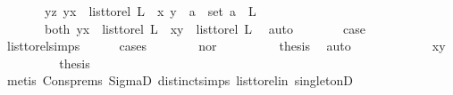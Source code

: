 \begin{isabellebody}
\ \ \ \ \ \ {\isacharbar}{\kern0pt}\ {\isacharparenleft}{\kern0pt}yz{\isacharparenright}{\kern0pt}\ {\isachardoublequoteopen}{\isacharparenleft}{\kern0pt}y{\isacharcomma}{\kern0pt}x{\isacharparenright}{\kern0pt}\ {\isasymin}\ list{\isacharunderscore}{\kern0pt}to{\isacharunderscore}{\kern0pt}rel\ L\ {\isasymand}\ {\isacharparenleft}{\kern0pt}x{\isacharcomma}{\kern0pt}\ y{\isacharparenright}{\kern0pt}\ {\isasymin}\ {\isacharbraceleft}{\kern0pt}a{\isacharbraceright}{\kern0pt}\ {\isasymtimes}\ set\ {\isacharparenleft}{\kern0pt}a\ {\isacharhash}{\kern0pt}\ L{\isacharparenright}{\kern0pt}{\isachardoublequoteclose}\isanewline
\ \ \ \ \ \ {\isacharbar}{\kern0pt}\ {\isacharparenleft}{\kern0pt}both{\isacharparenright}{\kern0pt}\ {\isachardoublequoteopen}{\isacharparenleft}{\kern0pt}y{\isacharcomma}{\kern0pt}x{\isacharparenright}{\kern0pt}\ {\isasymin}\ list{\isacharunderscore}{\kern0pt}to{\isacharunderscore}{\kern0pt}rel\ L\ {\isasymand}\ {\isacharparenleft}{\kern0pt}x{\isacharcomma}{\kern0pt}y{\isacharparenright}{\kern0pt}\ {\isasymin}\ list{\isacharunderscore}{\kern0pt}to{\isacharunderscore}{\kern0pt}rel\ L{\isachardoublequoteclose}\ \isamarkupfalse%
\ auto\isanewline
\ \ \ \ \isamarkupfalse%
\ \isamarkupfalse%
\ {\isacharquery}{\kern0pt}case\ \isamarkupfalse%
\ list{\isacharunderscore}{\kern0pt}to{\isacharunderscore}{\kern0pt}rel{\isachardot}{\kern0pt}simps\ \isanewline
\ \ \ \ \isamarkupfalse%
{\isacharparenleft}{\kern0pt}cases{\isacharparenright}{\kern0pt}\isanewline
\ \ \ \ \ \ \isamarkupfalse%
\ nor\isanewline
\ \ \ \ \ \ \isamarkupfalse%
\ \isamarkupfalse%
\ {\isacharquery}{\kern0pt}thesis\ \isamarkupfalse%
\ auto\isanewline
\ \ \ \ \isamarkupfalse%
\isanewline
\ \ \ \ \ \ \isamarkupfalse%
\ xy\isanewline
\ \ \ \ \ \ \isamarkupfalse%
\ \isamarkupfalse%
\ {\isacharquery}{\kern0pt}thesis\isanewline
\ \ \ \ \ \ \ \ \isamarkupfalse%
\ {\isacharparenleft}{\kern0pt}metis\ Cons{\isachardot}{\kern0pt}prems{\isacharparenleft}{\kern0pt}{}{\isacharparenright}{\kern0pt}\ SigmaD{}\ distinct{\isachardot}{\kern0pt}simps{\isacharparenleft}{\kern0pt}{}{\isacharparenright}{\kern0pt}\ list{\isacharunderscore}{\kern0pt}to{\isacharunderscore}{\kern0pt}rel{\isacharunderscore}{\kern0pt}in\ singletonD{\isacharparenright}{\kern0pt}\ \isanewline
\ \ \ \ \isamarkupfalse%
\isanewline
\ \ \ \ \ \ \isamarkupfalse%

\end{isabellebody}
